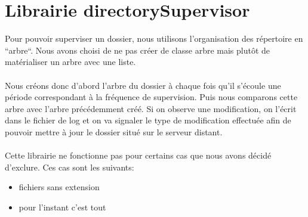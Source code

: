 \section{Librairie directorySupervisor}

Pour pouvoir superviser un dossier, nous utilisons l'organisation des répertoire en ``arbre``.
Nous avons choisi de ne pas créer de classe arbre mais plutôt de matérialiser un arbre avec une liste.\\
\\
Nous créons donc d'abord l'arbre du dossier à chaque fois qu'il s'écoule une période correspondant à la fréquence de supervision. 
Puis nous comparons cette arbre avec l'arbre précédemment créé. 
Si on observe une modification, on l'écrit dans le fichier de log et on va signaler le type de modification effectuée afin de pouvoir mettre à jour le dossier situé sur le serveur distant.\\
\\
Cette librairie ne fonctionne pas pour certains cas que nous avons décidé d'exclure. Ces cas sont les suivants:
\begin{itemize}
\item fichiers sans extension
\item pour l'instant c'est tout
\end{itemize}



